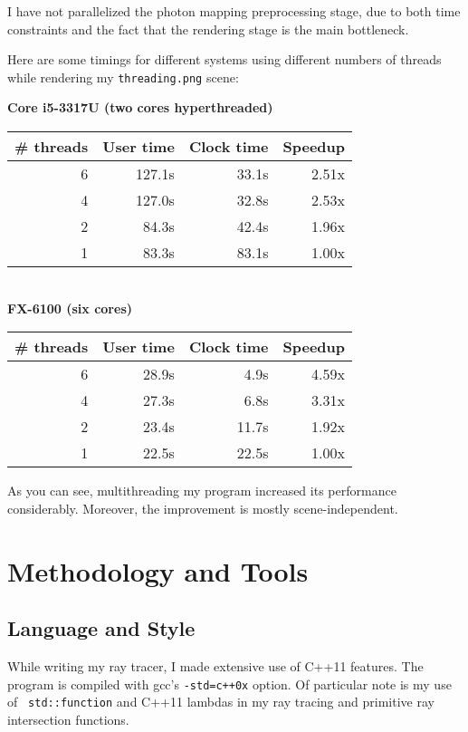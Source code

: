 \documentclass{article}
\begin{document}
I have not parallelized the photon mapping preprocessing stage, due to both time
constraints and the fact that the rendering stage is the main bottleneck.

Here are some timings for different systems using different numbers of threads
while rendering my {\tt threading.png} scene:

\begin{center}
\noindent\textbf{Core i5-3317U (two cores hyperthreaded)} \\
\begin{tabular}{|r|r|r|r|} \hline
  \# threads & User time & Clock time & Speedup \\\hline
           6 & 127.1s & 33.1s & 2.51x \\\hline
  4 & 127.0s & 32.8s & 2.53x \\\hline
  2 & 84.3s & 42.4s & 1.96x \\\hline
  1 & 83.3s & 83.1s & 1.00x \\\hline
\end{tabular} \\

\noindent\textbf{FX-6100 (six cores)} \\
  \begin{tabular}{|r|r|r|r|} \hline
  \# threads & User time & Clock time & Speedup \\\hline
           6 & 28.9s & 4.9s & 4.59x \\\hline
           4 & 27.3s & 6.8s & 3.31x \\\hline
           2 & 23.4s & 11.7s & 1.92x \\\hline
           1 & 22.5s & 22.5s & 1.00x \\\hline
  \end{tabular}

\end{center}

As you can see, multithreading my program increased its performance
considerably. Moreover, the improvement is mostly scene-independent.

\section{Methodology and Tools}

\subsection{Language and Style}

While writing my ray tracer, I made extensive use of C++11 features. The program
is compiled with gcc's {\tt -std=c++0x} option. Of particular note is my use of {\tt
std::function} and C++11 lambdas in my ray tracing and primitive ray intersection
functions.
\end{document}
